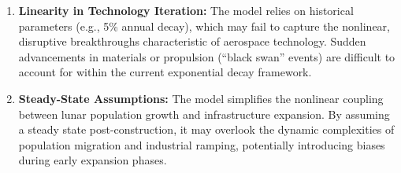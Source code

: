 \begin{enumerate}
    \item \textbf{Linearity in Technology Iteration:} The model relies on historical parameters (e.g., 5\% annual decay), which may fail to capture the nonlinear, disruptive breakthroughs characteristic of aerospace technology. Sudden advancements in materials or propulsion (``black swan'' events) are difficult to account for within the current exponential decay framework.
    \item \textbf{Steady-State Assumptions:} The model simplifies the nonlinear coupling between lunar population growth and infrastructure expansion. By assuming a steady state post-construction, it may overlook the dynamic complexities of population migration and industrial ramping, potentially introducing biases during early expansion phases.
\end{enumerate}